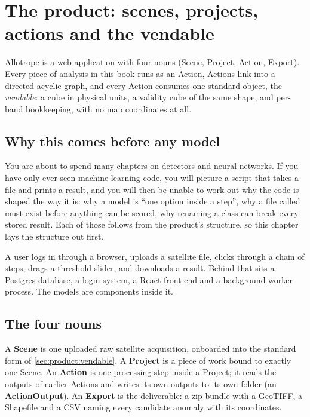 \chapter{The product: scenes, projects, actions and the vendable}\label{ch:product}

\begin{onething}
Allotrope is a web application with four nouns (Scene, Project, Action, Export). Every piece of
analysis in this book runs as an Action, Actions link into a directed acyclic graph, and every
Action consumes one standard object, the \emph{vendable}: a cube in physical units, a validity
cube of the same shape, and per-band bookkeeping, with no map coordinates at all.
\end{onething}

\section{Why this comes before any model}\label{sec:product:motivation}

You are about to spend many chapters on detectors and neural networks. If you have only ever seen
machine-learning code, you will picture a script that takes a file and prints a result, and you
will then be unable to work out why the code is shaped the way it is: why a model is ``one option
inside a step'', why a file called  must exist before anything can be
scored, why renaming a class can break every stored result. Each of those follows from the
product's structure, so this chapter lays the structure out first.

A user logs in through a browser, uploads a satellite file, clicks through a chain of steps,
drags a threshold slider, and downloads a result. Behind that sits a Postgres database, a login
system, a React front end and a background worker process. The models are components inside it.

\section{The four nouns}\label{sec:product:nouns}

\begin{definition}
A \textbf{Scene} is one uploaded raw satellite acquisition, onboarded into the standard form of
\cref{sec:product:vendable}. A \textbf{Project} is a piece of work bound to exactly one Scene. An
\textbf{Action} is one processing step inside a Project; it reads the outputs of earlier Actions
and writes its own outputs to its own folder (an \textbf{ActionOutput}). An \textbf{Export} is
the deliverable: a zip bundle with a GeoTIFF, a Shapefile and a CSV naming every candidate anomaly
with its coordinates.
\end{definition}

